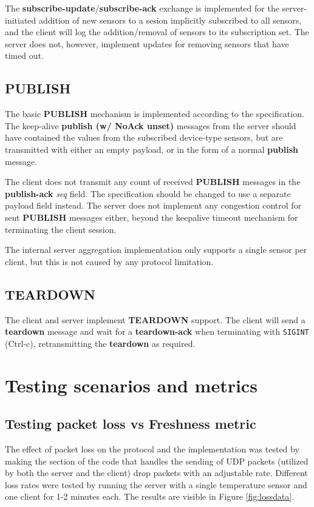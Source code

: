 \documentclass[a4paper]{article}
\begin{document}
The \textbf{subscribe-update}/\textbf{subscribe-ack} exchange is implemented for the server-initiated addition of new sensors to a sesion implicitly subscribed to all sensors, and the client will log the addition/removal of sensors to its subscription set.
The server does not, however, implement updates for removing sensors that have timed out.

\subsection{\textbf{PUBLISH}}
The basic \textbf{PUBLISH} mechanism is implemented according to the specification.
The keep-alive \textbf{publish (w/ NoAck unset)} messages from the server should have contained the values from the subscribed device-type sensors, but are transmitted with either an empty payload, or in the form of a normal \textbf{publish} message.

The client does not transmit any count of received \textbf{PUBLISH} messages in the \textbf{publish-ack} \textit{seq} field.
The specification should be changed to use a separate payload field instead.
The server does not implement any congestion control for sent \textbf{PUBLISH} messages either, beyond the keepalive timeout mechanism for terminating the client session.

The internal server aggregation implementation only supports a single sensor per client, but this is not caused by any protocol limitation.

\subsection{\textbf{TEARDOWN}}
The client and server implement \textbf{TEARDOWN} support.
The client will send a \textbf{teardown} message and wait for a \textbf{teardown-ack} when terminating with \texttt{SIGINT} (Ctrl-c), retransmitting the \textbf{teardown} as required.

\section{Testing scenarios and metrics}


\subsection{Testing packet loss vs Freshness metric}
The effect of packet loss on the protocol and the implementation was tested by 
making the section of the code that handles the sending of UDP packets (utilized
by both the server and the client) drop packets with an adjustable rate.
Different loss rates were tested by running the server with a single temperature
sensor and one client for 1-2 minutes each. The results are visible in Figure 
\ref{fig:lossdata}.
\end{document}
